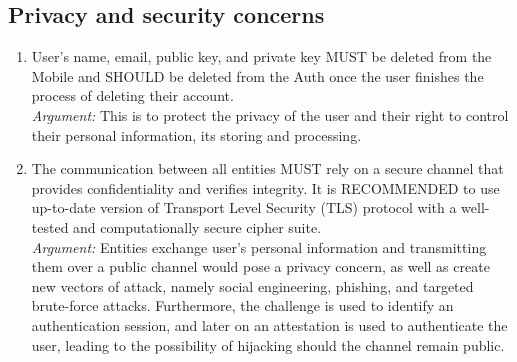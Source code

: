     \subsection{Privacy and security concerns}
        \begin{enumerate}[resume]
                \item User's name, email, public key, and private key MUST be deleted from the Mobile and SHOULD be deleted from the 
                      Auth once the user finishes the process of deleting their account.\\        
                \textit{Argument:} This is to protect the privacy of the user and their right to control their personal information, 
                                   its storing and processing.

                \item The communication between all entities MUST rely on a secure channel that provides confidentiality and 
                      verifies integrity. It is RECOMMENDED to use up-to-date version of Transport Level Security (TLS) protocol 
                      with a well-tested and computationally secure cipher suite.\\      
                \textit{Argument:} Entities exchange user's personal information and transmitting them over a 
                                   public channel would pose a privacy concern, as well as create new vectors of attack, 
                                   namely social engineering, phishing, and targeted brute-force attacks. Furthermore, 
                                   the challenge is used to identify an authentication session, and later on an attestation 
                                   is used to authenticate the user, leading to the possibility of hijacking should the channel
                                   remain public.                 
        \end{enumerate}
